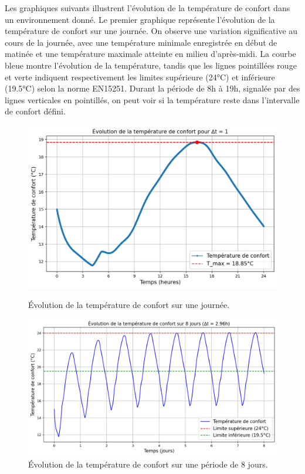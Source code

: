 \documentclass[12pt]{article}
\begin{document}
   
Les graphiques suivants illustrent l'évolution de la température de confort dans un environnement donné. Le premier graphique représente l'évolution de la température de confort sur une journée. On observe une variation significative au cours de la journée, avec une température minimale enregistrée en début de matinée et une température maximale atteinte en milieu d'après-midi. La courbe bleue montre l'évolution de la température, tandis que les lignes pointillées rouge et verte indiquent respectivement les limites supérieure (24°C) et inférieure (19.5°C) selon la norme EN15251. Durant la période de 8h à 19h, signalée par des lignes verticales en pointillés, on peut voir si la température reste dans l'intervalle de confort défini.
\begin{figure}[H]
    \centering
    \begin{minipage}{0.6\textwidth}
        \centering
        \includegraphics[width=\textwidth]{Rapport/figures/T_confort_24h.png}
        \caption{Évolution de la température de confort sur une journée.}
        \label{fig:journee}
    \end{minipage}
    \hfill
    \begin{minipage}{0.6\textwidth}
        \centering
        \includegraphics[width=\textwidth]{Rapport/figures/T_confort_8jours.png}
        \caption{Évolution de la température de confort sur une période de 8 jours.}
        \label{fig:periode}
    \end{minipage}
\end{figure}
    \label{fig:confort}
 \vspace{0.8 cm} 
\end{document}
